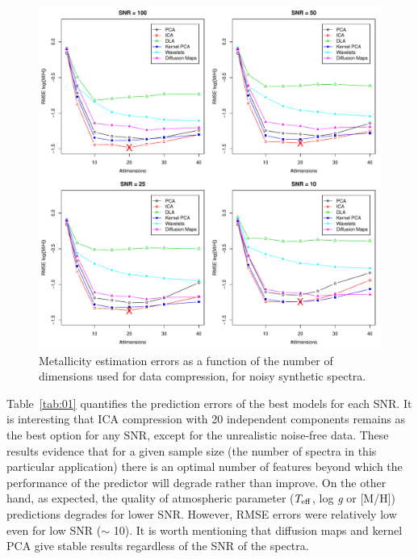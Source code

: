 \documentclass[a4paper,fleqn,usenatbib]{mnras}
\begin{document}
{{{\begin{figure}
\centering\includegraphics[width=\textwidth]{flamesHR10_Meta_log_BestSVM_N-RMSE_test.pdf}
\caption{Metallicity estimation errors as a function of the number of
  dimensions used for data compression, for noisy synthetic
  spectra.}
\label{fig:06}
\end{figure}

Table~\ref{tab:01} quantifies the prediction errors of the best models
for each SNR. It is interesting that ICA compression with 20
independent components remains as the best option for any SNR, except
for the unrealistic noise-free data. These results evidence that for a
given sample size (the number of spectra in this particular
application) there is an optimal number of features beyond which the
performance of the predictor will degrade rather than improve.  On the
other hand, as expected, the quality of atmospheric parameter ($T_{\rm
  eff}$, log \textit{g} or [M/H]) predictions degrades for lower
SNR. However, RMSE errors were relatively low even for low SNR ($\sim$
10).  It is worth mentioning that diffusion maps and kernel PCA give
stable results regardless of the SNR of the spectra.

}}}
\end{document}
